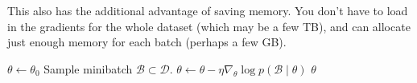   This also has the additional advantage of saving memory. You don't have to load in the gradients for the whole dataset (which may be a few TB), and can allocate just enough memory for each batch (perhaps a few GB). 

  \begin{algo}

    \begin{algorithm}[H]
    \label{alg:stochacistic-gradient-descent}
    \begin{algorithmic}[1]  %
        \State $\theta \gets \theta_0$ 
          \State Sample minibatch $\mathcal{B} \subset \mathcal{D}$. 
          \State $\theta \gets \theta - \eta \nabla_\theta \log p(\mathcal{B} \mid \theta)$ 
        \EndWhile
        \State \Return $\theta$
      \EndProcedure
    \end{algorithmic}
    \end{algorithm} 
  \end{algo} 

